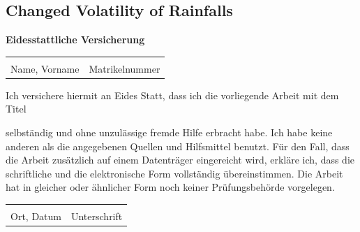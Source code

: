 \documentclass[12pt, a4paper, oneside]{article}
\begin{document}
	\subsection{Changed Volatility of Rainfalls}

	\printbibliography

	\newpage
	
	
	
	\begingroup
	\begin{center}
		\large
		\textbf{Eidesstattliche Versicherung}
	\end{center}
	
	\vspace{0.3cm}
	
	\begin{tabular}{@{}p{8cm}p{5.8cm}}
		\underline{\hspace{6cm}} & \underline{\hspace{5.8cm}} \\
		\vspace{0.02cm}Name, Vorname & \vspace{0.02cm}Matrikelnummer \\
	\end{tabular}
	\vspace{0.3cm}
	
	Ich versichere hiermit an Eides Statt, dass ich die vorliegende Arbeit mit dem Titel

	\begin{center}
		{\makeatletter{\emph{{\@title}}}\makeatother}
	\end{center}
	
	selbständig und ohne unzulässige fremde Hilfe erbracht habe. Ich habe keine anderen als die angegebenen Quellen und Hilfsmittel benutzt. Für den Fall, dass die Arbeit zusätzlich auf einem Datenträger eingereicht wird, erkläre ich, dass die schriftliche und die elektronische Form vollständig übereinstimmen. Die Arbeit hat in gleicher oder ähnlicher Form noch keiner Prüfungsbehörde vorgelegen.
	
	\vspace{0.6cm}
	
	\begin{tabular}{@{}p{8cm}p{5.8cm}}
		\underline{\smash{Aachen, den \today}} & \underline{\hspace{5.8cm}}\\
		Ort, Datum & Unterschrift \\
	\end{tabular}
	
\end{document}

